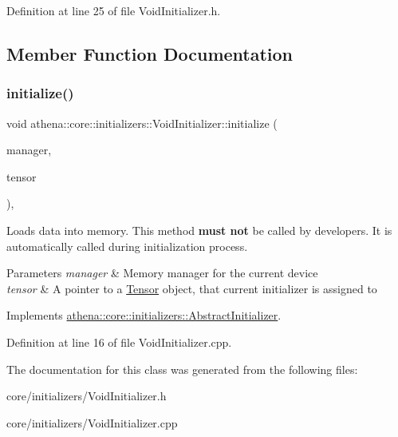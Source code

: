 Definition at line 25 of file Void\+Initializer.\+h.



\subsection{Member Function Documentation}
\mbox{\label{classathena_1_1core_1_1initializers_1_1_void_initializer_adcb637175e8cad5841cb21e53e0e138f}} 
\subsubsection{\texorpdfstring{initialize()}{initialize()}}
{\footnotesize\ttfamily void athena\+::core\+::initializers\+::\+Void\+Initializer\+::initialize (\begin{DoxyParamCaption}\item[{\mbox{\hyperlink{classathena_1_1backend_1_1_abstract_memory_manager}{athena\+::backend\+::\+Abstract\+Memory\+Manager}} $\ast$}]{manager,  }\item[{\mbox{\hyperlink{classathena_1_1core_1_1_tensor}{Tensor}} $\ast$}]{tensor }\end{DoxyParamCaption})\hspace{0.3cm}{\ttfamily [override]}, {\ttfamily [virtual]}}

Loads data into memory. This method {\bfseries must not} be called by developers. It is automatically called during initialization process. 
\begin{DoxyParams}{Parameters}
{\em manager} & Memory manager for the current device \\
\hline
{\em tensor} & A pointer to a \mbox{\hyperlink{classathena_1_1core_1_1_tensor}{Tensor}} object, that current initializer is assigned to \\
\hline
\end{DoxyParams}


Implements \mbox{\hyperlink{classathena_1_1core_1_1initializers_1_1_abstract_initializer_a9c0f0c57add306c9da8ffe8797532f62}{athena\+::core\+::initializers\+::\+Abstract\+Initializer}}.



Definition at line 16 of file Void\+Initializer.\+cpp.



The documentation for this class was generated from the following files\+:\begin{DoxyCompactItemize}
\item 
core/initializers/Void\+Initializer.\+h\item 
core/initializers/Void\+Initializer.\+cpp\end{DoxyCompactItemize}
